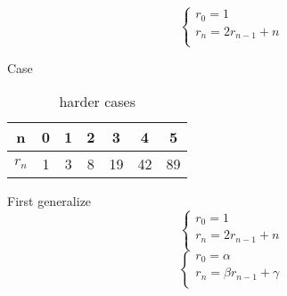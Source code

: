 \documentclass[mode=geye]{elegantnote}
\begin{document}
\begin{equation*}
    \left\{
        \begin{array}{l}
            r_0 = 1\\
            r_n = 2r_{n-1}+n\\
        \end{array}
    \right.
\end{equation*}

Case 
\begin{table}[htbp]
	\centering
	\small
	\caption{harder cases}
	\begin{tabular}{c|cccccc}
		\toprule
		n & 0 & 1 & 2 & 3 & 4 & 5 \\
		\midrule
        $ r_n $  & 1 & 3 & 8 & 19 & 42 & 89 \\
		\bottomrule
	\end{tabular}%
	\label{tab:casesofharder}%
\end{table}%

First generalize
\begin{equation*}
    \left\{
        \begin{array}{l}
            r_0 = 1\\
            r_n = 2r_{n-1}+n\\
        \end{array}
    \right.
\end{equation*}
\begin{equation*}
    \left\{
        \begin{array}{l}
            r_0 = \alpha\\
            r_n = \beta r_{n-1}+\gamma \\
        \end{array}
    \right.
\end{equation*}
\end{document}
